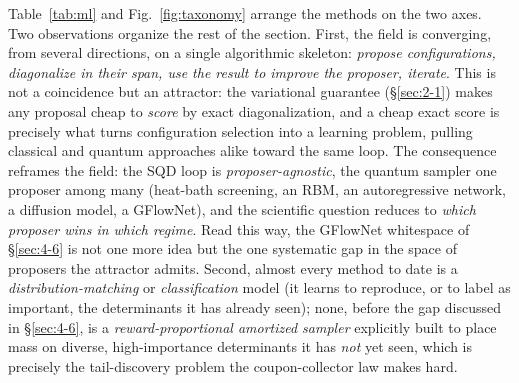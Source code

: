 \documentclass[11pt]{article}
\begin{document}
Table~\ref{tab:ml} and Fig.~\ref{fig:taxonomy} arrange the methods on the two axes. Two observations organize the rest of the section. First, the field is converging, from several directions, on a single algorithmic skeleton: \emph{propose configurations, diagonalize in their span, use the result to improve the proposer, iterate}. This is not a coincidence but an attractor: the variational guarantee (\S\ref{sec:2-1}) makes any proposal cheap to \emph{score} by exact diagonalization, and a cheap exact score is precisely what turns configuration selection into a learning problem, pulling classical and quantum approaches alike toward the same loop. The consequence reframes the field: the SQD loop is \emph{proposer-agnostic}, the quantum sampler one proposer among many (heat-bath screening, an RBM, an autoregressive network, a diffusion model, a GFlowNet), and the scientific question reduces to \emph{which proposer wins in which regime}. Read this way, the GFlowNet whitespace of \S\ref{sec:4-6} is not one more idea but the one systematic gap in the space of proposers the attractor admits. Second, almost every method to date is a \emph{distribution-matching} or \emph{classification} model (it learns to reproduce, or to label as important, the determinants it has already seen); none, before the gap discussed in \S\ref{sec:4-6}, is a \emph{reward-proportional amortized sampler} explicitly built to place mass on diverse, high-importance determinants it has \emph{not} yet seen, which is precisely the tail-discovery problem the coupon-collector law makes hard.
\end{document}
